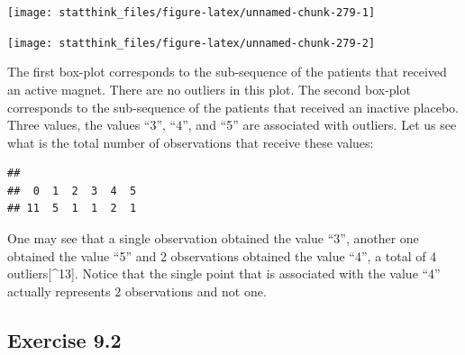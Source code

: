 \documentclass[]{krantz}
\makeatletter
\newenvironment{Shaded}{\begin{snugshade}}{\end{snugshade}}
\newcommand{\DecValTok}[1]{\textcolor[rgb]{0.00,0.00,0.81}{#1}}
\newcommand{\KeywordTok}[1]{\textcolor[rgb]{0.13,0.29,0.53}{\textbf{#1}}}
\newcommand{\NormalTok}[1]{#1}
\newcommand{\OperatorTok}[1]{\textcolor[rgb]{0.81,0.36,0.00}{\textbf{#1}}}
\newenvironment{kframe}{%
\medskip{}
\setlength{\fboxsep}{.8em}
 \def\at@end@of@kframe{}%
 \ifinner\ifhmode%
  \def\at@end@of@kframe{\end{minipage}}%
  \begin{minipage}{\columnwidth}%
 \fi\fi%
 \def\FrameCommand##1{\hskip\@totalleftmargin \hskip-\fboxsep
 \colorbox{shadecolor}{##1}\hskip-\fboxsep
     \hskip-\linewidth \hskip-\@totalleftmargin \hskip\columnwidth}%
 \MakeFramed {\advance\hsize-\width
   \@totalleftmargin\z@ \linewidth\hsize
   \@setminipage}}%
 {\par\unskip\endMakeFramed%
 \at@end@of@kframe}
\renewenvironment{Shaded}{\begin{kframe}}{\end{kframe}}
\theoremstyle{definition}
\theoremstyle{definition}
\theoremstyle{definition}
\theoremstyle{remark}
\makeatother
\begin{document}
\begin{enumerate}
  \begin{center}\texttt{[image: statthink\_files/figure-latex/unnamed-chunk-279-1]} \end{center}

\begin{Shaded}
\end{Shaded}

  \begin{center}\texttt{[image: statthink\_files/figure-latex/unnamed-chunk-279-2]} \end{center}

  The first box-plot
  corresponds to the sub-sequence of the patients that received
  an active magnet. There are no outliers in this plot. The second box-plot
  corresponds to the sub-sequence of the patients that received
  an inactive placebo. Three values, the values ``3'', ``4'', and ``5'' are
  associated with outliers. Let us see what is the total number of
  observations that receive these values:

\begin{Shaded}
\end{Shaded}

\begin{verbatim}
## 
##  0  1  2  3  4  5 
## 11  5  1  1  2  1
\end{verbatim}

  One may see that a single observation obtained the value ``3'', another
  one obtained the value ``5'' and 2 observations obtained the value ``4'', a
  total of 4 outliers{[}\^{}13{]}. Notice that the single point that is
  associated with the value ``4'' actually represents 2 observations and not
  one.
\end{enumerate}

\hypertarget{exercise-9.2}{%
\subsection*{Exercise 9.2}\label{exercise-9.2}}
\end{document}
